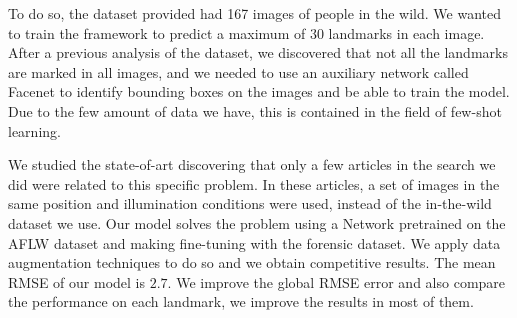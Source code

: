 \medskip

\noindent To do so, the dataset provided had 167 images of people in the wild. We wanted to train the framework to predict a maximum of $30$ landmarks in each image. After a previous analysis of the dataset, we discovered that not all the landmarks are marked in all images, and we needed to use an auxiliary network called Facenet to identify bounding boxes on the images and be able to train the model. Due to the few amount of data we have, this is contained in the field of few-shot learning. 

\medskip

\noindent We studied the state-of-art discovering that only a few articles in the search we did were related to this specific problem. In these articles, a set of images in the same position and illumination conditions were used, instead of the in-the-wild dataset we use. Our model solves the problem using a Network pretrained on the AFLW dataset and making fine-tuning with the forensic dataset. We apply data augmentation techniques to do so and we obtain competitive results. The mean RMSE of our model is $2.7$. We improve the global RMSE error and also compare the performance on each landmark, we improve the results in most of them.

\endinput
